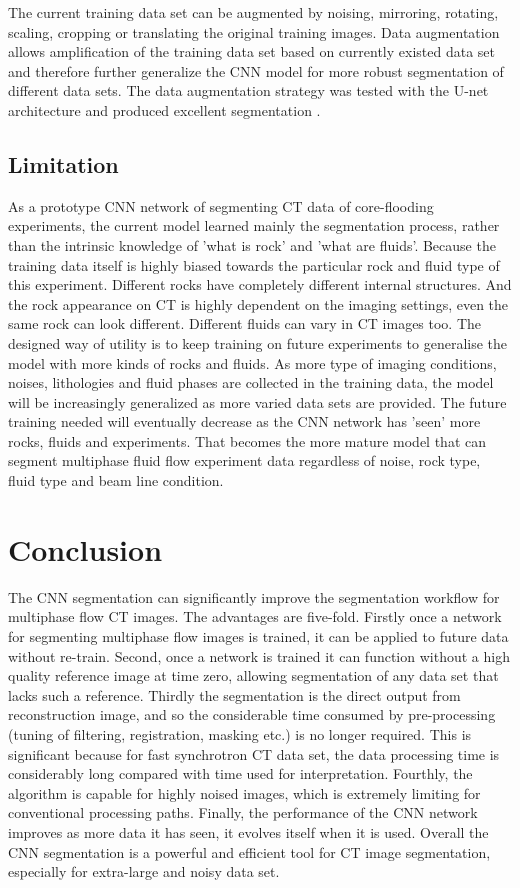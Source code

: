 \documentclass[draft,linenumbers]{agujournal2018}
\begin{document}
The current training data set can be augmented by noising, mirroring, rotating, scaling, cropping or translating the original training images. Data augmentation allows amplification of the training data set based on currently existed data set and therefore further generalize the CNN model for more robust segmentation of different data sets. The data augmentation strategy was tested with the U-net architecture and produced excellent segmentation \citep{ronneberger2015u}. 

\subsection{Limitation}
As a prototype CNN network of segmenting \textmu CT data of core-flooding experiments, the current model learned mainly the segmentation process, rather than the intrinsic knowledge of 'what is rock' and 'what are fluids'. Because the training data itself is highly biased towards the particular rock and fluid type of this experiment. Different rocks have completely different internal structures. And the rock appearance on \textmu CT is highly dependent on the imaging settings, even the same rock can look different. Different fluids can vary in \textmu CT images too. The designed way of utility is to keep training on future experiments to generalise the model with more kinds of rocks and fluids. As more type of imaging conditions, noises, lithologies and fluid phases are collected in the training data, the model will be increasingly generalized as more varied data sets are provided. The future training needed will eventually decrease as the CNN network has 'seen' more rocks, fluids and experiments. That becomes the more mature model that can segment multiphase fluid flow experiment data regardless of noise, rock type, fluid type and beam line condition.

\section{Conclusion}
The CNN segmentation can significantly improve the segmentation workflow for multiphase flow \textmu CT images. The advantages are five-fold. Firstly once a network for segmenting multiphase flow images is trained, it can be applied to future data without re-train. Second, once a network is trained it can function without a high quality reference image at time zero, allowing segmentation of any data set that lacks such a reference. Thirdly the segmentation is the direct output from reconstruction image, and so the considerable time consumed by pre-processing (tuning of filtering, registration, masking etc.) is no longer required. This is significant because for fast synchrotron \textmu CT data set, the data processing time is considerably long compared with time used for interpretation. Fourthly, the algorithm is capable for highly noised images, which is extremely limiting for conventional processing paths. Finally, the performance of the CNN network improves as more data it has seen, it evolves itself when it is used. Overall the CNN segmentation is a powerful and efficient tool for \textmu CT image segmentation, especially for extra-large and noisy data set.
\end{document}

